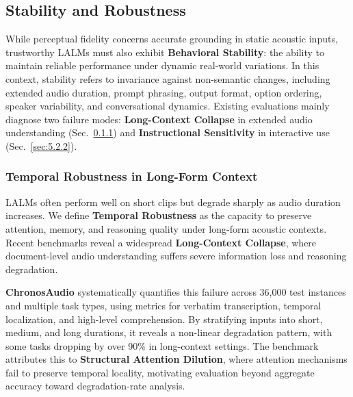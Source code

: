 \documentclass{llmxive}
\begin{document}

\subsection{Stability and Robustness}
\label{sec:5.2}

While perceptual fidelity concerns accurate grounding in static acoustic inputs, trustworthy LALMs must also exhibit \textbf{Behavioral Stability}: the ability to maintain reliable performance under dynamic real-world variations. In this context, stability refers to invariance against non-semantic changes, including extended audio duration, prompt phrasing, output format, option ordering, speaker variability, and conversational dynamics. Existing evaluations mainly diagnose two failure modes: \textbf{Long-Context Collapse} in extended audio understanding (Sec.~\ref{sec:5.2.1}) and \textbf{Instructional Sensitivity} in interactive use (Sec.~\ref{sec:5.2.2}).

\subsubsection{Temporal Robustness in Long-Form Context}
\label{sec:5.2.1}

LALMs often perform well on short clips but degrade sharply as audio duration increases. We define \textbf{Temporal Robustness} as the capacity to preserve attention, memory, and reasoning quality under long-form acoustic contexts. Recent benchmarks reveal a widespread \textbf{Long-Context Collapse}, where document-level audio understanding suffers severe information loss and reasoning degradation.

\textbf{ChronosAudio} \cite{luo2026chronosaudio} systematically quantifies this failure across 36,000 test instances and multiple task types, using metrics for verbatim transcription, temporal localization, and high-level comprehension. By stratifying inputs into short, medium, and long durations, it reveals a non-linear degradation pattern, with some tasks dropping by over 90\% in long-context settings. The benchmark attributes this to \textbf{Structural Attention Dilution}, where attention mechanisms fail to preserve temporal locality, motivating evaluation beyond aggregate accuracy toward degradation-rate analysis.
\end{document}
